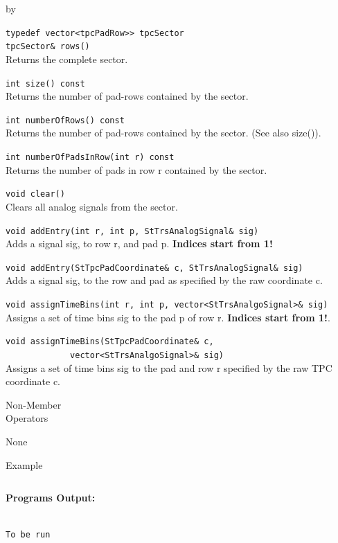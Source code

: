 \documentclass[twoside]{article}
\newcommand{\entrylabel}[1]{\mbox{\textbf{{#1}}}\hfil}%
\newenvironment{entry}
{\begin{list}{}%
    {\renewcommand{\makelabel}{\entrylabel}%
     \setlength{\labelwidth}{90pt}%
     \setlength{\leftmargin}{\labelwidth}
     \advance\leftmargin by \labelsep%
      }%
    }%
  {\end{list}}
\newcommand{\Entrylabel}[1]%
{\raisebox{0pt}[1ex][0pt]{\makebox[\labelwidth][l]%
    {\parbox[t]{\labelwidth}{\hspace{0pt}\textbf{{#1}}}}}}
\newenvironment{Entry}%
{\renewcommand{\entrylabel}{\Entrylabel}\begin{entry}}%
  {\end{entry}}
\begin{document}
\begin{Entry}
  \verb+typedef vector<tpcPadRow>> tpcSector+\\
  \verb+tpcSector& rows()+\\
  Returns the complete sector.

  \verb+int size() const+\\
  Returns the number of pad-rows contained by the sector.

  \verb+int numberOfRows() const+\\
  Returns the number of pad-rows contained by the sector. (See also size()).

  \verb+int numberOfPadsInRow(int r) const+\\
  Returns the number of pads in row r contained by the sector.

  \verb+void clear()+\\
  Clears all analog signals from the sector.

  \verb+void addEntry(int r, int p, StTrsAnalogSignal& sig)+\\
  Adds a signal sig, to row r, and pad p.
  {\bf Indices start from 1!}

  \verb+void addEntry(StTpcPadCoordinate& c, StTrsAnalogSignal& sig)+\\
  Adds a signal sig, to the row and pad as specified
  by the raw coordinate c.

  \verb+void assignTimeBins(int r, int p, vector<StTrsAnalgoSignal>& sig)+\\
  Assigns a set of time bins sig to the pad p of row r.  {\bf Indices start
    from 1!}.

  \verb+void assignTimeBins(StTpcPadCoordinate& c,+\\
  \verb+             vector<StTrsAnalgoSignal>& sig)+\\
  Assigns a set of time bins sig to the pad and row r
  specified by the raw TPC coordinate c.
  
\item[Non-Member \\ Operators]

  None
  
\item[Example]

{\footnotesize
\begin{verbatim}

\end{verbatim}
}%
{\bf Programs Output:}
{\footnotesize
\begin{verbatim}

To be run

\end{verbatim}
} %

\end{Entry}
\clearpage
\end{document}
